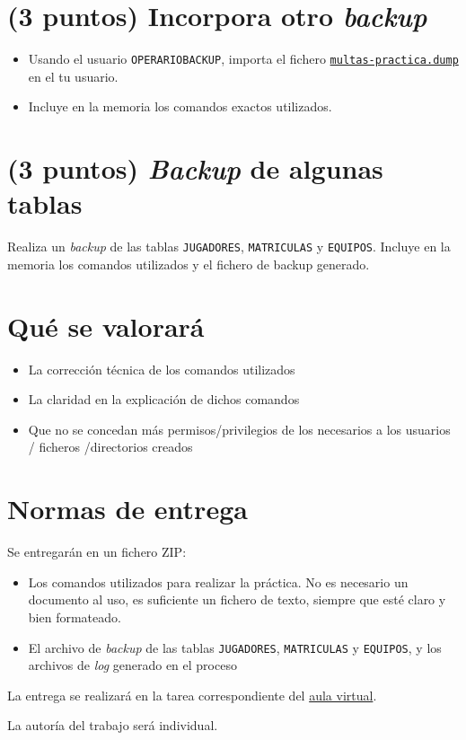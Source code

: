 \documentclass[a4paper]{article}
\begin{document}
\section*{(3 puntos) Incorpora otro \emph{backup}}
\label{sec:org000000c}
\begin{itemize}
\item Usando el usuario \texttt{OPERARIOBACKUP}, importa el fichero \href{https://alvarogonzalezsotillo.github.io/apuntes-clase/sistemas-gestores-bbdd-asir2/apuntes/2/multas-practica.dump}{\texttt{multas-practica.dump}} en el tu usuario.
\item Incluye en la memoria los comandos exactos utilizados.
\end{itemize}

\section*{(3 puntos) \emph{Backup} de algunas tablas}
\label{sec:org000000f}
Realiza un \emph{backup} de las tablas \texttt{JUGADORES}, \texttt{MATRICULAS} y \texttt{EQUIPOS}. Incluye en la memoria los comandos utilizados y el fichero de backup generado.  

\section*{Qué se valorará}
\label{sec:org0000012}
\begin{itemize}
\item La corrección técnica de los comandos utilizados
\item La claridad en la explicación de dichos comandos
\item Que no se concedan más permisos/privilegios de los necesarios a los usuarios / ficheros /directorios creados
\end{itemize}

\section*{Normas de entrega}
\label{sec:org0000015}
Se entregarán en un fichero ZIP:
\begin{itemize}
\item Los comandos utilizados para realizar la práctica. No es necesario un documento al uso, es suficiente un fichero de texto, siempre que esté claro y bien formateado.
\item El archivo de \emph{backup} de las tablas \texttt{JUGADORES}, \texttt{MATRICULAS} y \texttt{EQUIPOS}, y los archivos de \emph{log} generado en el proceso
\end{itemize}

La entrega se realizará en la tarea correspondiente del \href{https://aulavirtual3.educa.madrid.org/ies.alonsodeavellan.alcala}{aula virtual}.

La autoría del trabajo será individual.
\end{document}
